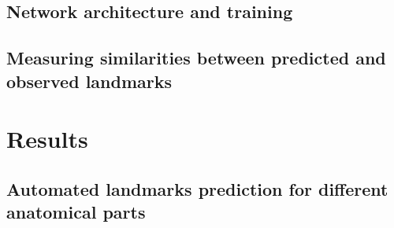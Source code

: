 \documentclass[review]{elsarticle}
\begin{document}
\subsection{Network architecture and training}

\subsection{Measuring similarities between predicted and observed landmarks}

\section{Results}

\subsection{Automated landmarks prediction for different anatomical parts}
\end{document}
